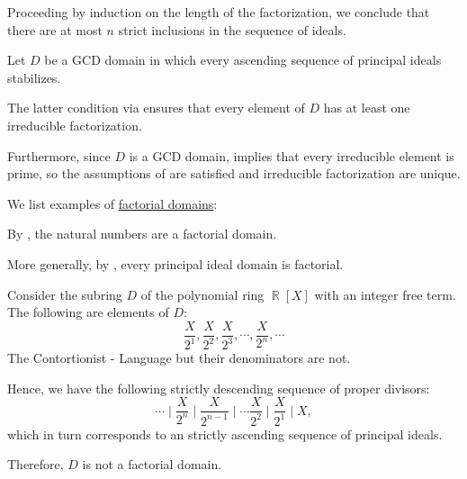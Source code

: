 \begin{defproof}
  Proceeding by induction on the length of the factorization, we conclude that there are at most \( n \) strict inclusions in the sequence of ideals.

   Let \( D \) be a GCD domain in which every ascending sequence of principal ideals stabilizes.

  The latter condition via  ensures that every element of \( D \) has at least one irreducible factorization.

  Furthermore, since \( D \) is a GCD domain,  implies that every irreducible element is prime, so the assumptions of  are satisfied and irreducible factorization are unique.
\end{defproof}

\begin{example}\label{ex:def:factorial_domain}
  We list examples of \hyperref[def:factorial_domain]{factorial domains}:
  \begin{thmenum}
     By , the natural numbers are a factorial domain.

     More generally, by , every principal ideal domain is factorial.

     Consider the subring \( D \) of the polynomial ring \( \BbbR[X] \) with an integer free term. The following are elements of \( D \):
    \begin{equation*}
      \frac X {2^1}, \frac X {2^2}, \frac X {2^3}, \cdots, \frac X {2^n}, \cdots
    \end{equation*}The Contortionist - Language
    but their denominators are not.

    Hence, we have the following strictly descending sequence of proper divisors:
    \begin{equation*}
      \cdots \mid \frac X {2^n} \mid \frac X {2^{n-1}} \mid \cdots \frac X {2^2} \mid \frac X {2^1} \mid X,
    \end{equation*}
    which in turn corresponds to an strictly ascending sequence of principal ideals.

    Therefore, \( D \) is not a factorial domain.
  \end{thmenum}
\end{example}

